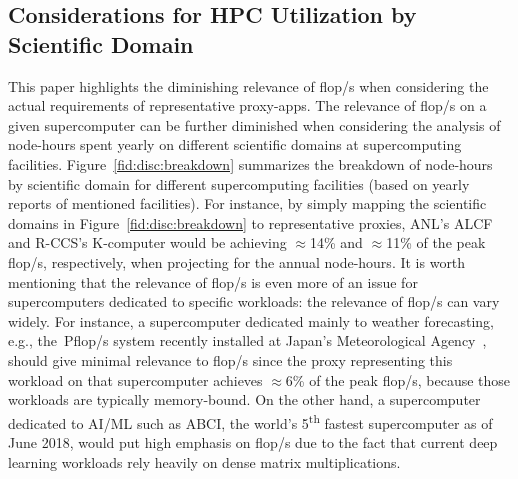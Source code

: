 \subsection{Considerations for HPC Utilization by Scientific Domain}\label{ssec:workload_util}
%
\begin{comment}
\begin{figure}[tbp]
    \centering
    \texttt{[image: sys-util]}
    \caption{\label{fid:disc:breakdown} Annual HPC site/system utilization by domain; Labels acc. to Table~\ref{table:APP}: \texttt{geo} = Geo-/Earthscience, \texttt{chm} = Chemistry, \texttt{phy} = Physics, \texttt{qcd} = Lattice QCD, \texttt{mat} = Material Science/Engineering, \texttt{eng} = Engineering (Mechanics, CFD), \texttt{mcs} = Math/Computer Science, \texttt{bio} = Bioscience, \texttt{oth} = \textit{Other}}
\end{figure}
\end{comment}
%
This paper highlights the diminishing relevance of \unit[]{flop/s} when
considering the actual requirements of representative proxy-apps.
The relevance of \unit[]{flop/s} on a given supercomputer can be further
diminished when considering the analysis of node-hours spent yearly on
different scientific domains at supercomputing facilities.
Figure~\ref{fid:disc:breakdown} summarizes the breakdown of node-hours by
scientific domain for different supercomputing facilities (based on yearly
reports of mentioned facilities). For instance, by simply mapping the scientific
domains in Figure~\ref{fid:disc:breakdown} to representative proxies,
ANL's ALCF and \mbox{R-CCS's} K-computer would be achieving $\approx$14\% and
$\approx$11\% of the peak \unit[]{flop/s}, respectively, when projecting
for the annual node-hours. %
It is worth mentioning that the relevance of \unit[]{flop/s} is even more
of an issue for supercomputers dedicated to specific workloads: the relevance of
\unit[]{flop/s} can vary widely. For instance, a supercomputer dedicated
mainly to weather forecasting, e.g., the~\unit[18]{Pflop/s} system recently
installed at Japan's Meteorological Agency~\cite{japan_meteorological_agency_jma_jma_2018},
should give minimal relevance to \unit[]{flop/s} since the proxy representing
this workload on that supercomputer achieves $\approx$6\% of the peak \unit[]{flop/s},
because those workloads are typically memory-bound. On the other hand, a
supercomputer dedicated to AI/ML such as ABCI, the world's 5\textsuperscript{th}
fastest supercomputer as of June 2018, would put high emphasis on \unit[]{flop/s}
due to the fact that current deep learning workloads rely heavily on dense matrix multiplications.


